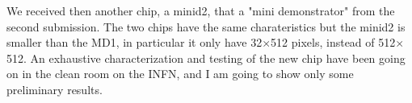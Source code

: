 


    We received then another chip, a minid2, that a "mini demonstrator" from the second submission. The two chips have the same charateristics but the minid2 is smaller than the MD1, in particular it only have 32$\times$512 pixels, instead of 512$\times$512.  
    An exhaustive characterization and testing of the new chip have been going on in the clean room on the INFN, and I am going to show only some preliminary results.

